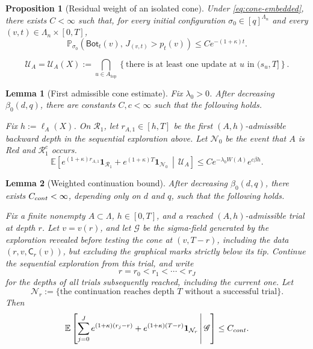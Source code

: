 \documentclass[10pt,a4paper]{amsart}
\newtheorem{prop}{Proposition}
\newtheorem{lemma}{Lemma}
\begin{document}
\begin{prop}[Residual weight of an isolated cone]\label{prop:isolated-cone-residual}
Under \eqref{eq:cone-embedded}, there exists \(C<\infty\) such that, for every
initial configuration \(\sigma_0\in[q]^{\Lambda_n}\) and every
\((v,t)\in\Lambda_n\times[0,T]\),
\[
\mathbb{P}_{\sigma_0}\left(
\mathsf{Bot}_t(v),\,J_{(v,t)}>p_t(v)
\right)\leq C e^{-(1+\kappa)t}.
\]
\end{prop}

\begin{equation}\label{eq:top-unit-U}
\mathcal U_A=\mathcal U_A(X)
        :=
        \bigcap_{u\in A_{\mathrm{top}}}
        \left\{
        \text{there is at least one update at }u
        \text{ in }(s_u,T]
        \right\}.
\end{equation}

\begin{lemma}[First admissible cone estimate]
\label{lem:first-h-admissible}
Fix \(\lambda_0>0\). After decreasing
\(\beta_0(d,q)\), there are constants \(C,c<\infty\) such that the following
holds.

Fix \(h:=\ell_A(X)\). On \(\mathcal R_1\), let \(r_{A,1}\in[h,T]\) be the
first \((A,h)\)-admissible backward depth in the sequential exploration above. Let
\(\mathcal N_0\) be the event that \(A\) is Red and \(\mathcal R_1^c\) occurs.
\[
        \mathbb E
        \left[
            e^{(1+\kappa)r_{A,1}}\mathbf 1_{\mathcal R_1}
            +
            e^{(1+\kappa)T}\mathbf 1_{\mathcal N_0}
            \,\middle|\,
            \mathcal U_A
        \right]
        \le
        C e^{-\lambda_0 W(A)}e^{c\beta h}.
\]
\end{lemma}

\begin{lemma}[Weighted continuation bound]
\label{lem:one-site-continuation}
After decreasing \(\beta_0(d,q)\), there exists \(C_{\rm cont}<\infty\), depending only on \(d\) and \(q\), such that the following holds.

Fix a finite nonempty \(A\subset\Lambda\), \(h\in[0,T]\), and a reached
\((A,h)\)-admissible trial at depth \(r\).  Let \(v=v(r)\), and let
\(\mathscr G\) be the sigma-field generated by the exploration revealed before
testing the cone at \((v,T-r)\), including the data
\((r,v,\mathsf C_r(v))\), but excluding the graphical marks strictly below its tip. 
Continue the sequential exploration from this trial, and write
\[
        r=r_0<r_1<\cdots<r_J
\]
for the depths of all trials subsequently reached, including the current one.
Let
\[
        \mathcal N_r
        :=
        \{\text{the continuation reaches depth \(T\) without a successful trial}\}.
\]
Then
\begin{equation}\label{eq:one-site-continuation}
\mathbb E\left[
    \sum_{j=0}^{J}e^{(1+\kappa)(r_j-r)}
    +e^{(1+\kappa)(T-r)}\mathbf 1_{\mathcal N_r}
    \,\middle|\,
    \mathscr G
\right]
\le C_{\rm cont}.
\end{equation}
\end{lemma}
\end{document}
